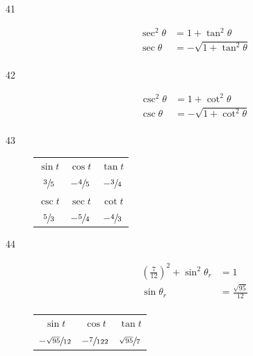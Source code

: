\documentclass{exam}
\begin{document}
\begin{description}
      \item[41]
        \begin{align*}
          \sec^2 \theta & = 1 + \tan^2 \theta \\
          \sec \theta   & = \boxed{ - \sqrt{ 1 + \tan^2 \theta } } \\
        \end{align*}

      \item[42]
        \begin{align*}
          \csc^2 \theta & = 1 + \cot^2 \theta \\
          \csc \theta   & = \boxed{ - \sqrt{ 1 + \cot^2 \theta } } \\
        \end{align*}

      \item[43]
        \begin{tabular}[H]{ccc}
          \toprule

          $\sin t$       & $\cos t$         & $\tan t$        \\
          $\sfrac{3}{5}$ & $- \sfrac{4}{5}$ & $- \sfrac{3}{4}$ \\

          \midrule

          $\csc t$       & $\sec t$         & $\cot t$ \\
          $\sfrac{5}{3}$ & $- \sfrac{5}{4}$ & $- \sfrac{4}{3}$ \\

          \bottomrule
        \end{tabular}

      \item[44]
        \begin{align*}
          \left( \frac{7}{12} \right)^2 + \sin^2 \theta_r & = 1 \\
          \sin \theta_r                                   & = \frac{\sqrt{95}}{12} \\
        \end{align*}

        \begin{tabular}[H]{ccc}
          \toprule

          $\sin t$                 & $\cos t$          & $\tan t$              \\
          $-\sfrac{\sqrt{95}}{12}$ & $-\sfrac{7}{122}$ & $\sfrac{\sqrt{95}}{7}$ \\

          \midrule


\end{tabular}
\end{description}
\end{document}
